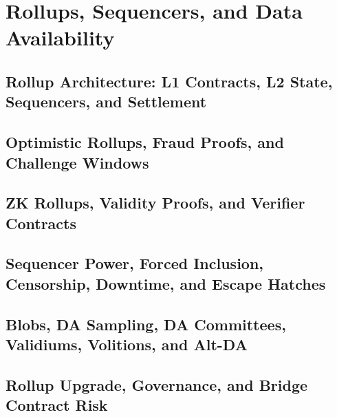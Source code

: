 \chapter{Rollups, Sequencers, and Data Availability}

\section{Rollup Architecture: L1 Contracts, L2 State, Sequencers, and Settlement}

\section{Optimistic Rollups, Fraud Proofs, and Challenge Windows}

\section{ZK Rollups, Validity Proofs, and Verifier Contracts}

\section{Sequencer Power, Forced Inclusion, Censorship, Downtime, and Escape Hatches}

\section{Blobs, DA Sampling, DA Committees, Validiums, Volitions, and Alt-DA}

\section{Rollup Upgrade, Governance, and Bridge Contract Risk}
